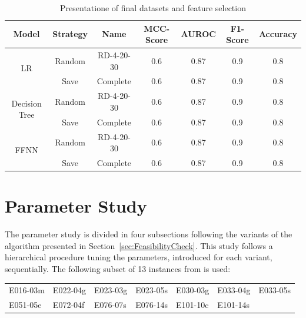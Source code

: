 \begin{table}[ht]
    \centering
    \begin{tabular}{c c c c c c c}
        \toprule
        Model                          & Strategy & Name       & \gls{MCC}-Score & \gls{AUROC} & F1-Score & Accuracy \\
        \midrule
        \multirow{2}{*}{\gls{LR}}      & Random   & RD-4-20-30 & 0.6             & 0.87        & 0.9      & 0.8      \\
                                       & Save     & Complete   & 0.6             & 0.87        & 0.9      & 0.8      \\
        \midrule
        \multirow{2}{*}{Decision Tree} & Random   & RD-4-20-30 & 0.6             & 0.87        & 0.9      & 0.8      \\
                                       & Save     & Complete   & 0.6             & 0.87        & 0.9      & 0.8      \\
        \midrule
        \multirow{2}{*}{\gls{FFNN}}    & Random   & RD-4-20-30 & 0.6             & 0.87        & 0.9      & 0.8      \\
                                       & Save     & Complete   & 0.6             & 0.87        & 0.9      & 0.8      \\

        \bottomrule
    \end{tabular}
    \caption{Presentatione of final datasets and feature selection}
    \label{tab:final_dataset_features}
\end{table}

\section{Parameter Study}
\label{sec:parameter_study}

The parameter study is divided in four subsections following the variants of the algorithm
presented in Section~\ref{sec:FeasibilityCheck}. This study follows a hierarchical procedure
tuning the parameters, introduced for each variant, sequentially. The following subset of 13
instances from \gendreauDataSetText is used:


\begin{table}[ht]
    \centering
    \setlength{\tabcolsep}{0.75em}
    \def\arraystretch{1.5}
    \begin{tabular}{lllllll}
        E016-03m & E022-04g & E023-03g & E023-05s & E030-03g & E033-04g & E033-05s \\
        E051-05e & E072-04f & E076-07s & E076-14s & E101-10c & E101-14s &          \\
    \end{tabular}
\end{table}

